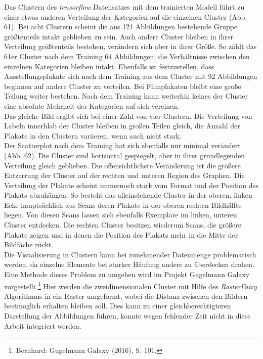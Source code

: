 \documentclass[a4paper,12pt,ngerman]{article}
\begin{document}
Das Clustern des \textit{tensorflow} Datensatzes mit dem trainierten Modell führt zu einer etwas anderen Verteilung der Kategorien auf die einzelnen Cluster (Abb. 61). Bei acht Clustern scheint die aus 121 Abbildungen bestehende Gruppe größtenteils intakt geblieben zu sein. Auch andere Cluster bleiben in ihrer Verteilung größtenteils bestehen, verändern sich aber in ihrer Größe. So zählt das 61er Cluster nach dem Training 64 Abbildungen, die Verhältnisse zwischen den einzelnen Kategorien bleiben intakt. Ebenfalls ist festzustellen, dass Ausstellungsplakate sich nach dem Training aus dem Cluster mit 92 Abbildungen beginnen auf andere Cluster zu verteilen. Bei Filmplakaten bleibt eine große Teilung weiter bestehen. Nach dem Training kann weiterhin keines der Cluster eine absolute Mehrheit der Kategorien auf sich vereinen. \\
Das gleiche Bild ergibt sich bei einer Zahl von vier Clustern. Die Verteilung von Labeln innerhlab der Cluster bleiben in großen Teilen gleich, die Anzahl der Plakate in den Clustern variieren, wenn auch nicht stark. \\
Der Scatterplot nach dem Training hat sich ebenfalls nur minimal verändert (Abb. 62). Die Cluster sind horizontal gespiegelt, aber in ihrer grundlegenden Verteilung gleich geblieben. Die offensichtlichste Veränderung ist die größere Entzerrung der Cluster auf der rechten und unteren Region des Graphen. Die Verteilung der Plakate scheint immernoch stark vom Format und der Position des Plakats abzuhängen. So besteht das alleinstehende Cluster in der oberen, linken Ecke hauptsächlich aus Scans deren Plakate in der oberen rechten Bildhälfte liegen. Von diesen Scans lassen sich ebenfalls Exemplare im linken, unteren Cluster entdecken. Die rechten Cluster besitzen wiederum Scans, die größere Plakate zeigen und in denen die Position des Plakats mehr in die Mitte der Bildfäche rückt. \\
Die Visualisierung in Clustern kann bei zunehmender Datenmenge problematisch werden, da einzelne Elemente bei starker Häufung andere zu überdecken drohen. Eine Methode dieses Problem zu umgehen wird im Projekt Gugelmann Galaxy vorgestellt.\footnote{Bernhard: Gugelmann Galaxy (2016), S. 101.} Hier werden die zweidimensionalen Cluster mit Hilfe des \textit{RasterFairy} Algorithmus in ein Raster umgeformt, wobei die Distanz zwischen den Bildern bestmöglich erhalten bleiben soll. Dies kann zu einer gleichberechtigteren Darstellung der Abbildungen führen, konnte wegen fehlender Zeit nicht in diese Arbeit integriert werden. \\
\end{document}

